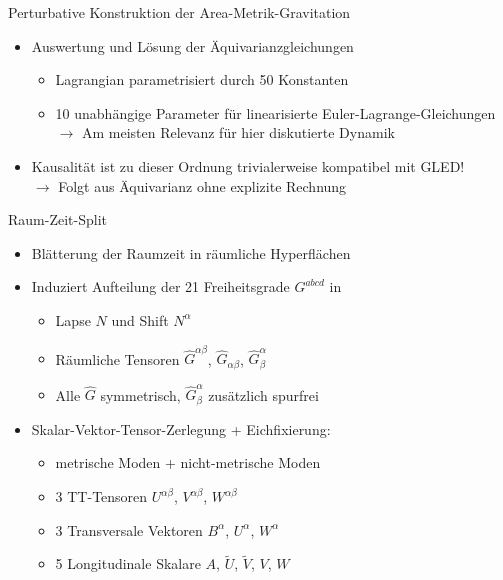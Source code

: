 \documentclass{beamer}
\begin{document}
    \begin{frame}{Perturbative Konstruktion der Area-Metrik-Gravitation}
        \begin{itemize}
            \item Auswertung und Lösung der Äquivarianzgleichungen
            \begin{itemize}
                \item Lagrangian parametrisiert durch 50 Konstanten
                \item \alert{10 unabhängige Parameter für linearisierte Euler-Lagrange-Gleichungen} \\
                $\rightarrow$ Am meisten Relevanz für hier diskutierte Dynamik
            \end{itemize}
            \item Kausalität ist zu dieser Ordnung trivialerweise kompatibel mit GLED! \\
            $\rightarrow$ Folgt aus Äquivarianz ohne explizite Rechnung
        \end{itemize}
    \end{frame}

    \begin{frame}{Raum-Zeit-Split}
        \begin{itemize}
            \item Blätterung der Raumzeit in räumliche Hyperflächen
            \item Induziert Aufteilung der 21 Freiheitsgrade $G^{abcd}$ in
            \begin{itemize}
                \item Lapse $N$ und Shift $N^\alpha$
                \item Räumliche Tensoren $\hat G^{\alpha\beta}$, $\hat G_{\alpha\beta}$, $\hat G^\alpha_\beta$
                \item Alle $\hat G$ symmetrisch, $\hat G^\alpha_\beta$ zusätzlich spurfrei
            \end{itemize}
            \item Skalar-Vektor-Tensor-Zerlegung + Eichfixierung:
            \begin{itemize}
                \item {\color{blue}metrische Moden} + {\color{alert}nicht-metrische Moden}
                \item 3 TT-Tensoren {\color{blue}$U^{\alpha\beta}$}, {\color{alert}$V^{\alpha\beta}$}, {\color{alert}$W^{\alpha\beta}$}
                \item 3 Transversale Vektoren {\color{blue}$B^\alpha$}, {\color{alert}$U^\alpha$}, {\color{alert}$W^\alpha$}
                \item 5 Longitudinale Skalare {\color{blue}$A$}, {\color{blue}$\tilde U$}, {\color{alert}$\tilde V$}, {\color{alert}$V$}, {\color{alert}$W$}
            \end{itemize}
        \end{itemize}
    \end{frame}
\end{document}

